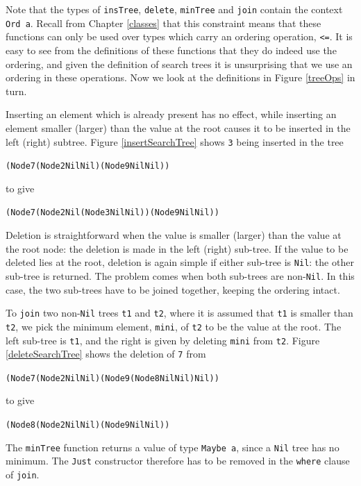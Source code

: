 Note that the types of \texttt{insTree}, \texttt{delete},
\texttt{minTree} and \texttt{join}
contain the
context \texttt{Ord a}.
Recall from Chapter \ref{classes} that this constraint means that
these functions can only be used over types which carry an ordering operation,
\texttt{<=}. It is easy to see from the definitions of these functions that they
do indeed use the ordering, and given the definition of search trees it
is unsurprising that we use an ordering in these operations. Now we look
at the definitions in Figure \ref{treeOps} in turn.

Inserting an element which is already present has no effect,
while inserting an element smaller (larger) than the value at the root causes
it to be inserted in the left (right) subtree. Figure \ref{insertSearchTree} shows \texttt{3} being
inserted in the tree 
\begin{alltt}
(Node 7 (Node 2 Nil Nil) (Node 9 Nil Nil))
\end{alltt}
to give
\begin{alltt}
(Node 7 (Node 2 Nil (Node 3 Nil Nil)) (Node 9 Nil Nil))
\end{alltt}


Deletion is straightforward when the value is smaller (larger) than the value
at the root node: the deletion is made in the left (right) sub-tree. If the
value to be deleted lies at the root, deletion is again simple if either
sub-tree is \texttt{Nil}: the other sub-tree is returned. The problem comes when
both sub-trees are non-\texttt{Nil}. In this case, the two sub-trees have to be
joined together, keeping the ordering intact. 

To \texttt{join} two non-\texttt{Nil} trees \texttt{t1} and \texttt{t2}, where it is assumed that
\texttt{t1} is smaller than \texttt{t2}, we pick the
minimum element, \texttt{mini}, of \texttt{t2} to be the value at the root. The left
sub-tree is \texttt{t1}, and the right is given by deleting \texttt{mini} from 
\texttt{t2}. Figure \ref{deleteSearchTree}  shows the deletion of
\texttt{7} from
\begin{alltt}
(Node 7 (Node 2 Nil Nil) (Node 9 (Node 8 Nil Nil) Nil))
\end{alltt} 
to give
\begin{alltt}
(Node 8 (Node 2 Nil Nil) (Node 9 Nil Nil))
\end{alltt} 
The \texttt{minTree} function returns a value of type
\texttt{Maybe a}, since a \texttt{Nil} tree has no minimum. The \texttt{Just} constructor
therefore has to be removed in the \texttt{where} clause of \texttt{join}.

